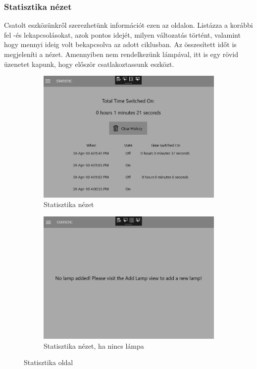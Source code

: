 \documentclass[a4paper,12pt]{report}
\begin{document}
\subsubsection{Statisztika nézet}
    Csatolt eszközünkről szerezhetünk információt ezen az oldalon. Listázza a korábbi fel -és lekapcsolásokat, azok pontos idejét,
    milyen változatás történt, valamint hogy mennyi ideig volt bekapcsolva az adott ciklusban. Az összesített időt is megjeleníti a
    nézet. Amennyiben nem rendelkezünk lámpával, itt is egy rövid üzenetet kapunk, hogy először csatlakoztassunk eszközt.

\begin{figure}[H]
    \centering
    \begin{subfigure}[b]{0.4\linewidth}
        \includegraphics[width=\linewidth]{images/statisticview.jpg}
        \caption{Statisztika nézet}
    \end{subfigure}
    \begin{subfigure}[b]{0.4\linewidth}
        \includegraphics[width=\linewidth]{images/statisticnolamp.jpg}
        \caption{Statisztika nézet, ha nincs lámpa}
    \end{subfigure}
    \caption{Statisztika oldal}
    \label{fig:Statistic}
\end{figure}
\end{document}
